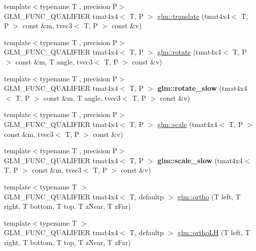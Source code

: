 \begin{DoxyCompactItemize}
\item 
{\footnotesize template$<$typename T , precision P$>$ }\\G\+L\+M\+\_\+\+F\+U\+N\+C\+\_\+\+Q\+U\+A\+L\+I\+F\+I\+ER tmat4x4$<$ T, P $>$ \hyperlink{group__gtc__matrix__transform_gaee134ab77c6c5548a6ebf4e8e476c6ed}{glm\+::translate} (tmat4x4$<$ T, P $>$ const \&m, tvec3$<$ T, P $>$ const \&v)
\item 
{\footnotesize template$<$typename T , precision P$>$ }\\G\+L\+M\+\_\+\+F\+U\+N\+C\+\_\+\+Q\+U\+A\+L\+I\+F\+I\+ER tmat4x4$<$ T, P $>$ \hyperlink{group__gtc__matrix__transform_ga161b1df124348f232d994ba7958e4815}{glm\+::rotate} (tmat4x4$<$ T, P $>$ const \&m, T angle, tvec3$<$ T, P $>$ const \&v)
\item 
\mbox{\label{matrix__transform_8inl_a9fbbd196726ba74b00b82b9a3d48487f}} 
{\footnotesize template$<$typename T , precision P$>$ }\\G\+L\+M\+\_\+\+F\+U\+N\+C\+\_\+\+Q\+U\+A\+L\+I\+F\+I\+ER tmat4x4$<$ T, P $>$ {\bfseries glm\+::rotate\+\_\+slow} (tmat4x4$<$ T, P $>$ const \&m, T angle, tvec3$<$ T, P $>$ const \&v)
\item 
{\footnotesize template$<$typename T , precision P$>$ }\\G\+L\+M\+\_\+\+F\+U\+N\+C\+\_\+\+Q\+U\+A\+L\+I\+F\+I\+ER tmat4x4$<$ T, P $>$ \hyperlink{group__gtc__matrix__transform_ga8f062fcc07e2445500793f2803afebb0}{glm\+::scale} (tmat4x4$<$ T, P $>$ const \&m, tvec3$<$ T, P $>$ const \&v)
\item 
\mbox{\label{matrix__transform_8inl_afae64498e6edd7aa501c1a7fa071f779}} 
{\footnotesize template$<$typename T , precision P$>$ }\\G\+L\+M\+\_\+\+F\+U\+N\+C\+\_\+\+Q\+U\+A\+L\+I\+F\+I\+ER tmat4x4$<$ T, P $>$ {\bfseries glm\+::scale\+\_\+slow} (tmat4x4$<$ T, P $>$ const \&m, tvec3$<$ T, P $>$ const \&v)
\item 
{\footnotesize template$<$typename T $>$ }\\G\+L\+M\+\_\+\+F\+U\+N\+C\+\_\+\+Q\+U\+A\+L\+I\+F\+I\+ER tmat4x4$<$ T, defaultp $>$ \hyperlink{group__gtc__matrix__transform_ga65280251de6e38580110a0577a43d8f8}{glm\+::ortho} (T left, T right, T bottom, T top, T z\+Near, T z\+Far)
\item 
{\footnotesize template$<$typename T $>$ }\\G\+L\+M\+\_\+\+F\+U\+N\+C\+\_\+\+Q\+U\+A\+L\+I\+F\+I\+ER tmat4x4$<$ T, defaultp $>$ \hyperlink{group__gtc__matrix__transform_ga71503df1e691b12cc2d45e64fd0628fe}{glm\+::ortho\+LH} (T left, T right, T bottom, T top, T z\+Near, T z\+Far)

\end{DoxyCompactItemize}
